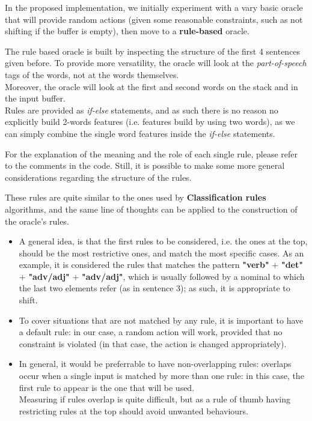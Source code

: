 \documentclass[
12pt,
a4paper,
oneside,
headinclude,
footinclude]{article}
\begin{document}
    In the proposed implementation, we initially experiment with a vary basic oracle that will provide random actions (given some reasonable constraints, such as not shifting if the buffer is empty), then move to a \textbf{rule-based} oracle.
    
    The rule based oracle is built by inspecting the structure of the first 4 sentences given before. To provide more versatility, the oracle will look at the \textit{part-of-speech} tags of the words, not at the words themselves.\\
    Moreover, the oracle will look at the first and second words on the stack and in the input buffer. \\
    Rules are provided as \textit{if-else} statements, and as such there is no reason no explicitly build 2-words features (i.e. features build by using two words), as we can simply combine the single word features inside the \textit{if-else} statements.
    
    For the explanation of the meaning and the role of each single rule, please refer to the comments in the code. Still, it is possible to make some more general considerations regarding the structure of the rules.
    
    These rules are quite similar to the ones used by \textbf{Classification rules} algorithms, and the same line of thoughts can be applied to the construction of the oracle's rules.
    
    \begin{itemize}
        \item A general idea, is that the first rules to be considered, i.e. the ones at the top, should be the most restrictive ones, and match the most specific cases. As an example, it is considered the rules that matches the pattern \textbf{"verb"} $+$ \textbf{"det"} $+$ \textbf{"adv/adj"} $+$ \textbf{"adv/adj"}, which is usually followed by a nominal to which the last two elements refer (as in sentence 3); as such, it is appropriate to shift. 
        \item To cover situations that are not matched by any rule, it is important to have a default rule: in our case, a random action will work, provided that no constraint is violated (in that case, the action is changed appropriately).
        \item In general, it would be preferrable to have non-overlapping rules: overlaps occur when a single input is matched by more than one rule: in this case, the first rule to appear is the one that will be used. \\
        Measuring if rules overlap is quite difficult, but as a rule of thumb having restricting rules at the top should avoid unwanted behaviours.
    \end{itemize}
    
\end{document}
